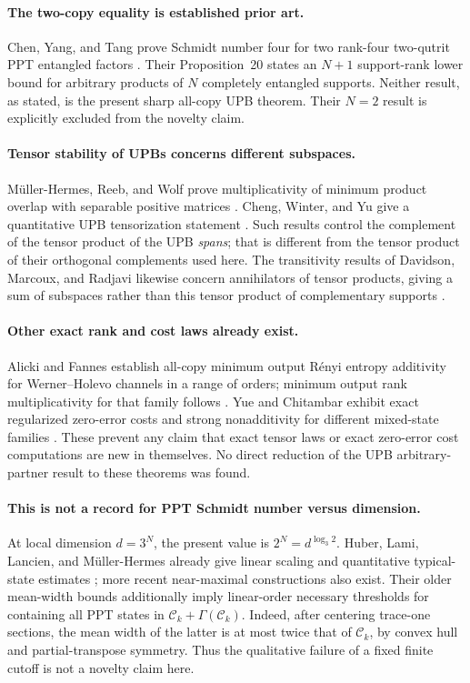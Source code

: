\documentclass[11pt]{article}
\theoremstyle{definition}
\begin{document}
\paragraph{The two-copy equality is established prior art.}
Chen, Yang, and Tang prove Schmidt number four for two rank-four two-qutrit
PPT entangled factors \cite[Lemma~19(iii)]{chen2017}. Their Proposition~20
states an $N+1$ support-rank lower bound for arbitrary products of $N$
completely entangled supports. Neither result, as stated, is the present
sharp all-copy UPB theorem. Their $N=2$ result is explicitly excluded from
the novelty claim.

\paragraph{Tensor stability of UPBs concerns different subspaces.}
M\"uller-Hermes, Reeb, and Wolf prove multiplicativity of minimum product
overlap with separable positive matrices \cite[Lemma~3]{mhrw2016}.
Cheng, Winter, and Yu give a quantitative UPB tensorization statement
\cite[version~1, Section~6]{cheng2020}. Such results control the complement
of the tensor product of the UPB \emph{spans}; that is different from the
tensor product of their orthogonal complements used here. The transitivity
results of Davidson, Marcoux, and Radjavi likewise concern annihilators of
tensor products, giving a sum of subspaces rather than this tensor product
of complementary supports \cite[Section~3]{dmr2008}.

\paragraph{Other exact rank and cost laws already exist.}
Alicki and Fannes establish all-copy minimum output R\'enyi entropy
additivity for Werner--Holevo channels in a range of orders; minimum output
rank multiplicativity for that family follows \cite{alicki2004}.
Yue and Chitambar exhibit exact regularized zero-error costs and strong
nonadditivity for different mixed-state families \cite{yue2019}.
These prevent any claim that exact tensor laws or exact zero-error cost
computations are new in themselves. No direct reduction of the UPB
arbitrary-partner result to these theorems was found.

\paragraph{This is not a record for PPT Schmidt number versus dimension.}
At local dimension $d=3^N$, the present value is
$2^N=d^{\log_3 2}$. Huber, Lami, Lancien, and M\"uller-Hermes already give
linear scaling and quantitative typical-state estimates
\cite{hllmh2018}; more recent near-maximal constructions also exist. Their older mean-width bounds additionally
imply linear-order necessary thresholds for containing all PPT states in
$\mathcal C_k+\Gamma(\mathcal C_k)$. Indeed, after centering trace-one
sections, the mean width of the latter is at most twice that of
$\mathcal C_k$, by convex hull and partial-transpose symmetry. Thus the
qualitative failure of a fixed finite cutoff is not a novelty claim here.
\end{document}
